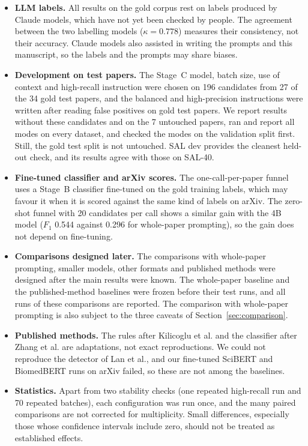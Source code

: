 \begin{itemize}
  \item \textbf{LLM labels.} All results on the gold corpus rest on labels produced by Claude models, which have not yet been checked by people. The agreement between the two labelling models ($\kappa = 0.778$) measures their consistency, not their accuracy. Claude models also assisted in writing the prompts and this manuscript, so the labels and the prompts may share biases.
  \item \textbf{Development on test papers.} The Stage~C model, batch size, use of context and high-recall instruction were chosen on 196 candidates from 27 of the 34 gold test papers, and the balanced and high-precision instructions were written after reading false positives on gold test papers. We report results without these candidates and on the 7 untouched papers, ran and report all modes on every dataset, and checked the modes on the validation split first. Still, the gold test split is not untouched. SAL dev provides the cleanest held-out check, and its results agree with those on SAL-40.
  \item \textbf{Fine-tuned classifier and arXiv scores.} The one-call-per-paper funnel uses a Stage~B classifier fine-tuned on the gold training labels, which may favour it when it is scored against the same kind of labels on arXiv. The zero-shot funnel with 20 candidates per call shows a similar gain with the 4B model ($F_1$ 0.544 against 0.296 for whole-paper prompting), so the gain does not depend on fine-tuning.
  \item \textbf{Comparisons designed later.} The comparisons with whole-paper prompting, smaller models, other formats and published methods were designed after the main results were known. The whole-paper baseline and the published-method baselines were frozen before their test runs, and all runs of these comparisons are reported. The comparison with whole-paper prompting is also subject to the three caveats of Section~\ref{sec:comparison}.
  \item \textbf{Published methods.} The rules after Kilicoglu et al. and the classifier after Zhang et al. are adaptations, not exact reproductions. We could not reproduce the detector of Lan et al., and our fine-tuned SciBERT and BiomedBERT runs on arXiv failed, so these are not among the baselines.
  \item \textbf{Statistics.} Apart from two stability checks (one repeated high-recall run and 70 repeated batches), each configuration was run once, and the many paired comparisons are not corrected for multiplicity. Small differences, especially those whose confidence intervals include zero, should not be treated as established effects.

\end{itemize}
